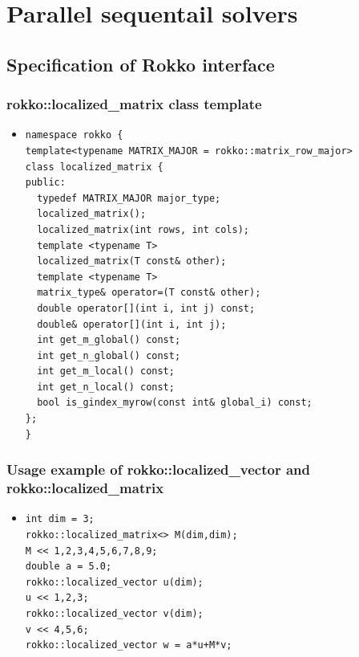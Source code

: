 \section{Parallel sequentail solvers}

\subsection{Specification of Rokko interface}

\begin{frame}[c,fragile]
  \frametitle{rokko::localized\_matrix class template}
  \begin{itemize}
  \item {}
\begin{lstlisting}
namespace rokko {
template<typename MATRIX_MAJOR = rokko::matrix_row_major>
class localized_matrix {
public:
  typedef MATRIX_MAJOR major_type;
  localized_matrix();
  localized_matrix(int rows, int cols);
  template <typename T>
  localized_matrix(T const& other);
  template <typename T>
  matrix_type& operator=(T const& other);
  double operator[](int i, int j) const;
  double& operator[](int i, int j);
  int get_m_global() const;
  int get_n_global() const;
  int get_m_local() const;
  int get_n_local() const;
  bool is_gindex_myrow(const int& global_i) const;
};
}
\end{lstlisting}
  \end{itemize}
\end{frame}

\begin{frame}[c,fragile]
  \frametitle{Usage example of rokko::localized\_vector and rokko::localized\_matrix}
  \begin{itemize}
  \item {}
\begin{lstlisting}
int dim = 3;
rokko::localized_matrix<> M(dim,dim);
M << 1,2,3,4,5,6,7,8,9;
double a = 5.0;
rokko::localized_vector u(dim);
u << 1,2,3;
rokko::localized_vector v(dim);
v << 4,5,6;
rokko::localized_vector w = a*u+M*v;
\end{lstlisting}
  \end{itemize}
\end{frame}

